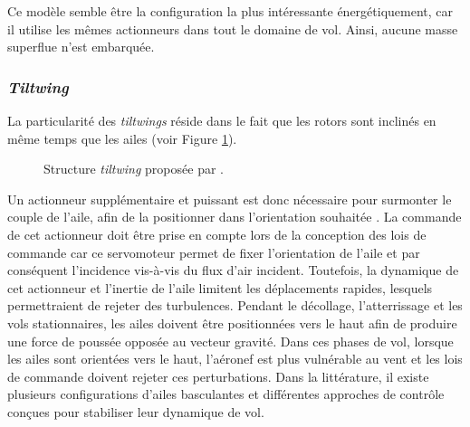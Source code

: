  
        Ce modèle semble être la configuration la plus intéressante énergétiquement, car il utilise les mêmes actionneurs dans tout le domaine de vol. Ainsi, aucune masse superflue n'est embarquée.

    
        \subsubsection*{\textit{Tiltwing}} 
        La particularité des \textit{tiltwings} réside dans le fait que les rotors sont inclinés en même temps que les ailes (voir Figure \ref{fig:tiltwing}). 

        \begin{figure}[ht!]
            \centering
            \caption{Structure \textit{tiltwing}  proposée par \cite{Aero2_2024, Ostermann2012ControlCO}.}
            \label{fig:tiltwing}
        \end{figure}
        
        Un actionneur supplémentaire et puissant est donc nécessaire pour surmonter le couple de l'aile, afin de la positionner dans l'orientation souhaitée \cite{holsten2011design, rohr2019attitude, ccetinsoy2012design}. La commande de cet actionneur doit être prise en compte lors de la conception des lois de commande car ce servomoteur permet de fixer l'orientation de l'aile et par conséquent l'incidence vis-à-vis du flux d'air incident. Toutefois, la dynamique de cet actionneur et l'inertie de l'aile limitent les déplacements rapides, lesquels permettraient de rejeter des turbulences. Pendant le décollage, l'atterrissage et les vols stationnaires, les ailes doivent être positionnées vers le haut afin de produire une force de poussée opposée au vecteur gravité. Dans ces phases de vol, lorsque les ailes sont orientées vers le haut, l'aéronef est plus vulnérable au vent et les lois de commande doivent rejeter ces perturbations. Dans la littérature, il existe plusieurs configurations d'ailes basculantes et différentes approches de contrôle conçues pour stabiliser leur dynamique de vol.
       
